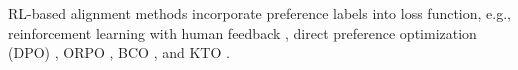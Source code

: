 RL-based alignment methods incorporate preference labels into loss function, e.g., reinforcement learning with human feedback \cite{ziegler2019fine}, direct preference optimization (DPO) \cite{rafailov2024direct}, ORPO \cite{hong2024orpo}, BCO \cite{jung2024binary}, and KTO \cite{ethayarajhmodel}.
  \vspace{-0.08in}